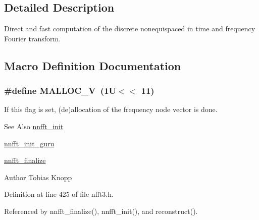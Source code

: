 \subsection{Detailed Description}
Direct and fast computation of the discrete nonequispaced in time and frequency Fourier transform. 

\subsection{Macro Definition Documentation}
\hypertarget{group__nnfft_gabfc80597fb6dcd28f3b9728bd7082642}{
\subsubsection[{M\-A\-L\-L\-O\-C\-\_\-\-V}]{\setlength{\rightskip}{0pt plus 5cm}\#define M\-A\-L\-L\-O\-C\-\_\-\-V~(1\-U$<$$<$ 11)}}\label{group__nnfft_gabfc80597fb6dcd28f3b9728bd7082642}
If this flag is set, (de)allocation of the frequency node vector is done.

\begin{DoxySeeAlso}{See Also}
\hyperlink{group__nnfft_gad1f2d4b5b20fd14087364714f6475b19}{nnfft\-\_\-init} 

\hyperlink{group__nnfft_ga75a2cb786f4cc4c87082c87a2c32046a}{nnfft\-\_\-init\-\_\-guru} 

\hyperlink{group__nnfft_ga9b5bcde6c436f8fe0e8d8dc4fa7a4230}{nnfft\-\_\-finalize} 
\end{DoxySeeAlso}
\begin{DoxyAuthor}{Author}
Tobias Knopp 
\end{DoxyAuthor}


Definition at line 425 of file nfft3.\-h.



Referenced by nnfft\-\_\-finalize(), nnfft\-\_\-init(), and reconstruct().



